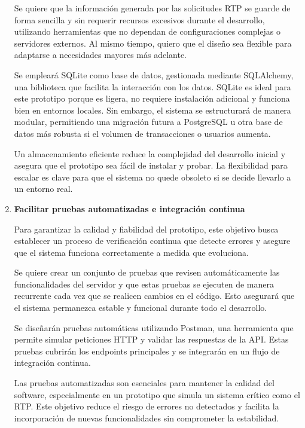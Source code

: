 \begin{enumerate}[label=\textbf{\arabic*}]
    Se quiere que la información generada por las solicitudes RTP se guarde de forma sencilla y sin requerir recursos excesivos durante el desarrollo, utilizando herramientas que no dependan de configuraciones complejas o servidores externos. Al mismo tiempo, quiero que el diseño sea flexible para adaptarse a necesidades mayores más adelante.

    Se empleará SQLite como base de datos, gestionada mediante SQLAlchemy, una biblioteca que facilita la interacción con los datos. SQLite es ideal para este prototipo porque es ligera, no requiere instalación adicional y funciona bien en entornos locales. Sin embargo, el sistema se estructurará de manera modular, permitiendo una migración futura a PostgreSQL u otra base de datos más robusta si el volumen de transacciones o usuarios aumenta.

    Un almacenamiento eficiente reduce la complejidad del desarrollo inicial y asegura que el prototipo sea fácil de instalar y probar. La flexibilidad para escalar es clave para que el sistema no quede obsoleto si se decide llevarlo a un entorno real.
  
  \item \textbf{Facilitar pruebas automatizadas e integración continua}

    Para garantizar la calidad y fiabilidad del prototipo, este objetivo busca establecer un proceso de verificación continua que detecte errores y asegure que el sistema funciona correctamente a medida que evoluciona.

    Se quiere crear un conjunto de pruebas que revisen automáticamente las funcionalidades del servidor y que estas pruebas se ejecuten de manera recurrente cada vez que se realicen cambios en el código. Esto asegurará que el sistema permanezca estable y funcional durante todo el desarrollo.

    Se diseñarán pruebas automáticas utilizando Postman, una herramienta que permite simular peticiones HTTP y validar las respuestas de la API. Estas pruebas cubrirán los endpoints principales y se integrarán en un flujo de integración continua.

    Las pruebas automatizadas son esenciales para mantener la calidad del software, especialmente en un prototipo que simula un sistema crítico como el RTP. Este objetivo reduce el riesgo de errores no detectados y facilita la incorporación de nuevas funcionalidades sin comprometer la estabilidad.

\end{enumerate}

